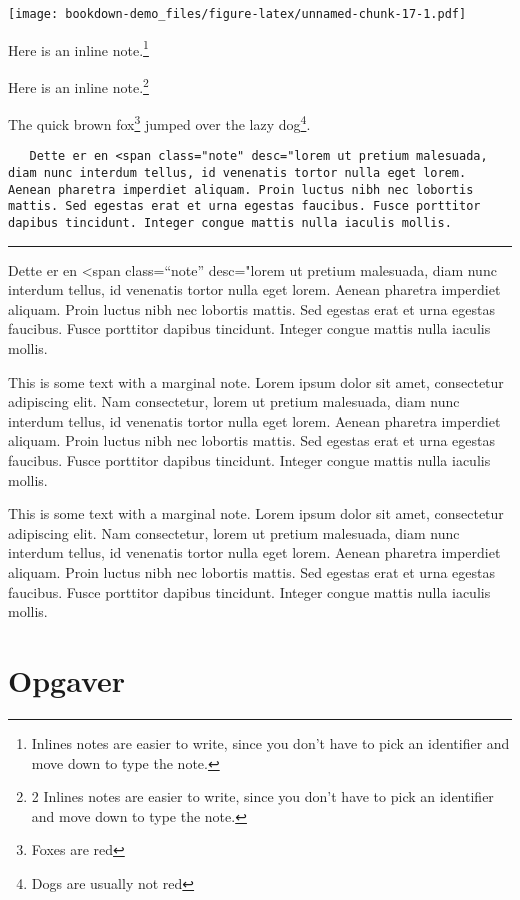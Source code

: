 \documentclass[]{book}
\let\rmarkdownfootnote\footnote%
\def\footnote{\protect\rmarkdownfootnote}
\theoremstyle{definition}
\theoremstyle{definition}
\theoremstyle{definition}
\theoremstyle{remark}
\begin{document}
\texttt{[image: bookdown-demo\_files/figure-latex/unnamed-chunk-17-1.pdf]}

Here is an inline note.\footnote{Inlines notes are easier to write,
  since you don't have to pick an identifier and move down to type the
  note.}

Here is an inline note.\footnote{2 Inlines notes are easier to write,
  since you don't have to pick an identifier and move down to type the
  note.}

The quick brown fox\footnote{Foxes are red} jumped over the lazy
dog\footnote{Dogs are usually not red}.

\begin{verbatim}
   Dette er en <span class="note" desc="lorem ut pretium malesuada, diam nunc interdum tellus, id venenatis tortor nulla eget lorem. Aenean pharetra imperdiet aliquam. Proin luctus nibh nec lobortis mattis. Sed egestas erat et urna egestas faucibus. Fusce porttitor dapibus tincidunt. Integer congue mattis nulla iaculis mollis.
\end{verbatim}

\begin{center}\rule{0.5\linewidth}{\linethickness}\end{center}

Dette er en \textless{}span class=``note'' desc="lorem ut pretium
malesuada, diam nunc interdum tellus, id venenatis tortor nulla eget
lorem. Aenean pharetra imperdiet aliquam. Proin luctus nibh nec lobortis
mattis. Sed egestas erat et urna egestas faucibus. Fusce porttitor
dapibus tincidunt. Integer congue mattis nulla iaculis mollis.

This is some text with a {marginal note}. Lorem ipsum dolor sit amet,
consectetur adipiscing elit. Nam consectetur, lorem ut pretium
malesuada, diam nunc interdum tellus, id venenatis tortor nulla eget
lorem. Aenean pharetra imperdiet aliquam. Proin luctus nibh nec lobortis
mattis. Sed egestas erat et urna egestas faucibus. Fusce porttitor
dapibus tincidunt. Integer congue mattis nulla iaculis mollis.

This is some text with a {marginal note}. Lorem ipsum dolor sit amet,
consectetur adipiscing elit. Nam consectetur, lorem ut pretium
malesuada, diam nunc interdum tellus, id venenatis tortor nulla eget
lorem. Aenean pharetra imperdiet aliquam. Proin luctus nibh nec lobortis
mattis. Sed egestas erat et urna egestas faucibus. Fusce porttitor
dapibus tincidunt. Integer congue mattis nulla iaculis mollis.

\hypertarget{opgaver}{%
\section{Opgaver}\label{opgaver}}
\end{document}
